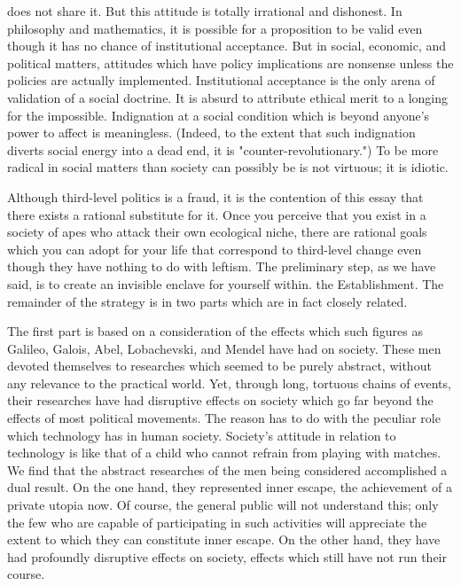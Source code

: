 \documentclass[10pt,twoside]{memoir}
\begin{document}
\begin{enumerate}
{{{{does not share it. But this attitude is totally irrational and dishonest. In 
philosophy and mathematics, it is possible for a proposition to be valid even 
though it has no chance of institutional acceptance. But in social, economic, 
and political matters, attitudes which have policy implications are nonsense 
unless the policies are actually implemented. Institutional acceptance is the 
only arena of validation of a social doctrine. It is absurd to attribute ethical 
merit to a longing for the impossible. Indignation at a social condition which 
is beyond anyone's power to affect is meaningless. (Indeed, to the extent 
that such indignation diverts social energy into a dead end, it is 
"counter-revolutionary.") To be more radical in social matters than society 
can possibly be is not virtuous; it is idiotic. 

Although third-level politics is a fraud, it is the contention of this essay 
that there exists a rational substitute for it. Once you perceive that you exist 
in a society of apes who attack their own ecological niche, there are rational 
goals which you can adopt for your life that correspond to third-level change 
even though they have nothing to do with leftism. The preliminary step, as 
we have said, is to create an invisible enclave for yourself within. the 
Establishment. The remainder of the strategy is in two parts which are in 
fact closely related. 

The first part is based on a consideration of the effects which such 
figures as Galileo, Galois, Abel, Lobachevski, and Mendel have had on 
society. These men devoted themselves to researches which seemed to be 
purely abstract, without any relevance to the practical world. Yet, through 
long, tortuous chains of events, their researches have had disruptive effects 
on society which go far beyond the effects of most political movements. The 
reason has to do with the peculiar role which technology has in human 
society. Society's attitude in relation to technology is like that of a child 
who cannot refrain from playing with matches. We find that 
the abstract researches of the men being considered accomplished a dual 
result. On the one hand, they represented inner escape, the achievement of a 
private utopia now. Of course, the general public will not understand this; 
only the few who are capable of participating in such activities will 
appreciate the extent to which they can constitute inner escape. On the 
other hand, they have had profoundly disruptive effects on society, effects 
which still have not run their course. 

}}}}
\end{enumerate}
\end{document}
